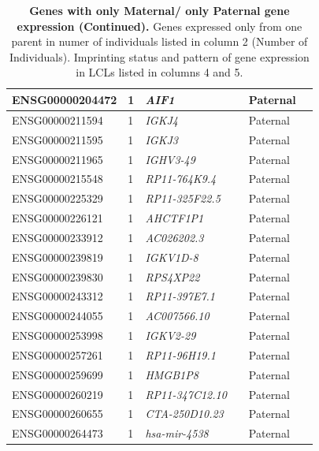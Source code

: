 \begin{table}
\begin{adjustbox}{width={\textwidth}}
\begin{tabular}{@{}p{4cm}p{3cm}p{3cm}p{3cm}p{3cm}p{3cm}@{}}
ENSG00000204472 & 1 & \emph{AIF1} & &  Paternal &   \\ \hline
ENSG00000211594 & 1 & \emph{IGKJ4} & &  Paternal &   \\ \hline
ENSG00000211595 & 1 & \emph{IGKJ3} & &  Paternal &   \\ \hline
ENSG00000211965 & 1 & \emph{IGHV3-49} & & Paternal &   \\ \hline
ENSG00000215548 & 1 & \emph{RP11-764K9.4} & &  Paternal &   \\ \hline
ENSG00000225329 & 1 & \emph{RP11-325F22.5} & &  Paternal &   \\ \hline
ENSG00000226121 & 1 & \emph{AHCTF1P1} & &  Paternal &   \\ \hline
ENSG00000233912 & 1 & \emph{AC026202.3} & &  Paternal &   \\ \hline
ENSG00000239819 & 1 & \emph{IGKV1D-8} & &  Paternal &   \\ \hline
ENSG00000239830 & 1 & \emph{RPS4XP22} & &  Paternal &   \\ \hline
ENSG00000243312 & 1 & \emph{RP11-397E7.1}& &  Paternal &   \\ \hline
ENSG00000244055 & 1 & \emph{AC007566.10} & &  Paternal &   \\ \hline
ENSG00000253998 & 1 & \emph{IGKV2-29} & &  Paternal &   \\ \hline
ENSG00000257261 & 1 & \emph{RP11-96H19.1} & &  Paternal &   \\ \hline
ENSG00000259699 & 1 & \emph{HMGB1P8} & &  Paternal &   \\ \hline
ENSG00000260219 & 1 & \emph{RP11-347C12.10} & &  Paternal &  \\ \hline
ENSG00000260655 & 1 & \emph{CTA-250D10.23} & & Paternal &  \\ \hline
ENSG00000264473 & 1 & \emph{hsa-mir-4538} & &  Paternal &  \\ \hline
\end{tabular}
\end{adjustbox}
\caption[]{\textbf{Genes with only Maternal/ only Paternal gene expression (Continued).  }Genes expressed only from one parent in numer of individuals listed in column 2 (Number of Individuals). Imprinting status and pattern of gene expression in LCLs listed in columns 4 and 5.}
\label{tab:oneparentexpression3}
\end{table}


